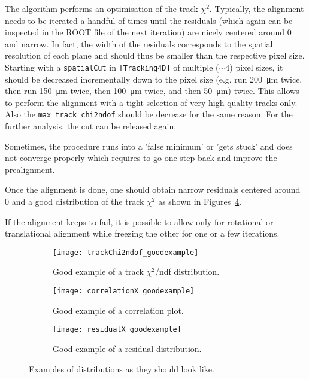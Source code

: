 The algorithm performs an optimisation of the track $\chi^2$.
Typically, the alignment needs to be iterated a handful of times until the residuals (which again can be inspected in the ROOT file of the next iteration) are nicely centered around 0 and narrow.
In fact, the width of the residuals corresponds to the spatial resolution of each plane and should thus be smaller than the respective pixel size.
Starting with a \texttt{spatialCut} in \texttt{[Tracking4D]} of multiple ($\sim4$) pixel sizes, it should be decreased incrementally down to the pixel size (e.g. run \SI{200}{\micro\m} twice, then run \SI{150}{\micro\m} twice, then \SI{100}{\micro\m} twice, and then \SI{50}{\micro\m}) twice.
This allows to perform the alignment with a tight selection of very high quality tracks only.
Also the \texttt{max\_track\_chi2ndof} should be decrease for the same reason.
For the further analysis, the cut can be released again.

Sometimes, the procedure runs into a 'false minimum' or 'gets stuck' and does not converge properly which requires to go one step back and improve the prealignment.

Once the alignment is done, one should obtain narrow residuals centered around 0 and a good distribution of the track $\chi^2$ as shown in Figures~\ref{fig:exampleAlignment}.

If the alignment keeps to fail, it is possible to allow only for rotational or translational alignment while freezing the other for one or a few iterations.

\begin{figure}
    \centering
    \begin{subfigure}[t]{0.66\textwidth}
        \texttt{[image: trackChi2ndof\_goodexample]}
        \caption{Good example of a track $\chi^2$/ndf distribution.}
        \label{fig:trackChi2}
    \end{subfigure}
    \begin{subfigure}[t]{0.66\textwidth}
        \texttt{[image: correlationX\_goodexample]}
        \caption{Good example of a correlation plot.}
        \label{fig:correlationX}
    \end{subfigure}
    \begin{subfigure}[t]{0.66\textwidth}
        \texttt{[image: residualX\_goodexample]}
        \caption{Good example of a residual distribution.}
        \label{fig:residualX}
    \end{subfigure}
    \caption{Examples of distributions as they should look like.}
    \label{fig:exampleAlignment}
\end{figure}

